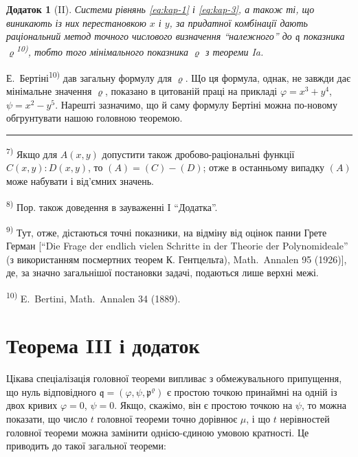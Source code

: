 \documentclass[11pt]{article}
\newcommand{\foreign}[1]{#1}
\theoremstyle{plain}
\newtheorem{zusatz}{Додаток}
\begin{document}
\begin{zusatz}[II]
Системи рівнянь \eqref{eq:kap-1} і \eqref{eq:kap-3}, а також ті, що
виникають із них перестановкою $x$ і $y$, за придатної комбінації
дають раціональний метод точного числового визначення ``належного''
до $\mathfrak{q}$ показника $\varrho$\textsuperscript{10)}, тобто того
мінімального показника $\varrho$ з теореми Ia.
\end{zusatz}

Е.\ Бертіні\textsuperscript{10)} дав загальну формулу для $\varrho$.
Що ця формула, однак, не завжди дає мінімальне значення $\varrho$,
показано в цитованій праці на прикладі
$\varphi = x^{3} + y^{4}$, $\psi = x^{2} - y^{5}$. Нарешті зазначимо,
що й саму формулу Бертіні можна по-новому обгрунтувати нашою
головною теоремою.

\vspace{0.5em}
\noindent\rule{\textwidth}{0.4pt}
\vspace{0.3em}

{\footnotesize
\textsuperscript{7)} Якщо для $A(x,y)$ допустити також дробово-раціональні
функції $C(x,y):D(x,y)$, то $(A) = (C) - (D)$; отже в останньому
випадку $(A)$ може набувати і від'ємних значень.

\textsuperscript{8)} Пор. також доведення в зауваженні I ``Додатка''.

\textsuperscript{9)} Тут, отже, дістаються точні показники, на відміну від
оцінок панни Грете Герман [``Die Frage der endlich vielen Schritte
in der Theorie der Polynomideale'' (з використанням посмертних
теорем К. Гентцельта), \foreign{Math.\ Annalen} 95 (1926)], де, за
значно загальнішої постановки задачі, подаються лише верхні межі.

\textsuperscript{10)} E.\ Bertini, \foreign{Math.\ Annalen} 34 (1889).
}

\newpage
\section*{Теорема III і додаток}

Цікава спеціалізація головної теореми випливає з обмежувального
припущення, що нуль відповідного
$\mathfrak{q} = (\varphi, \psi, \mathfrak{p}^{\varrho})$ є простою
точкою принаймні на одній із двох кривих $\varphi = 0$, $\psi = 0$.
Якщо, скажімо, він є простою точкою на $\psi$, то можна показати,
що число $t$ головної теореми точно дорівнює $\mu$, і що $t$
нерівностей головної теореми можна замінити однією-єдиною умовою
кратності. Це приводить до такої загальної теореми:
\end{document}

